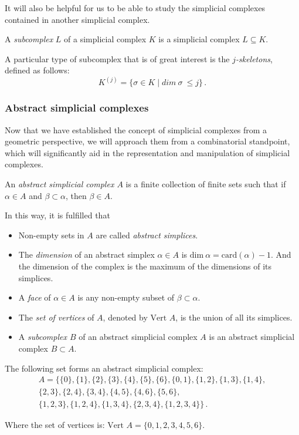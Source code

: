 \documentclass[../main.tex]{subfiles}
\begin{document}
It will also be helpful for us to be able to study the simplicial complexes contained in another simplicial complex.
\begin{definition}
A \emph{subcomplex} $L$ of a simplicial complex $K$ is a simplicial complex $L \subseteq K$.
\end{definition}

A particular type of subcomplex that is of great interest is the \emph{$j$-skeletons}, defined as follows: \[K^{(j)} = \{\sigma \in K \mid dim\ \sigma\ \leq j \}\,.\]

\subsubsection*{Abstract simplicial complexes}
Now that we have established the concept of simplicial complexes from a geometric perspective, we will approach them from a combinatorial standpoint, which will significantly aid in the representation and manipulation of simplicial complexes.

\begin{definition}
An \emph{abstract simplicial complex $A$} is a finite collection of finite sets such that if $\alpha \in A$ and $\beta \subset \alpha$, then $\beta \in A$.
\end{definition}
In this way, it is fulfilled that
\begin{itemize}
    \item Non-empty sets in $A$ are called \emph{abstract simplices}.
    \item The \emph{dimension} of an abstract simplex $\alpha \in A$ is $\text{dim}\ \alpha = \text{card}(\alpha) - 1$. And the dimension of the complex is the maximum of the dimensions of its simplices.
    \item A \emph{face} of $\alpha \in A$ is any non-empty subset of $\beta \subset \alpha$.
    \item The \emph{set of vertices} of $A$, denoted by $\text{Vert } A$, is the union of all its simplices.
    \item A \emph{subcomplex $B$} of an abstract simplicial complex $A$ is an abstract simplicial complex $B \subset A$.
\end{itemize}

\begin{exmp}
The following set forms an abstract simplicial complex:
\begin{gather*}
A = \{\{0\},\{1\},\{2\},\{3\},\{4\},\{5\},\{6\},\{0,1\},\{1,2\},\{1,3\},\{1,4\},\\
\{2,3\},\{2,4\},\{3,4\},\{4,5\},\{4,6\},\{5,6\},\\
\{1,2,3\},\{1,2,4\},\{1,3,4\},\{2,3,4\},\{1,2,3,4\}\}\,.
\end{gather*}

Where the set of vertices is: $\text{Vert }A = \{0, 1, 2, 3, 4, 5, 6\}$.
\end{exmp}
\end{document}
